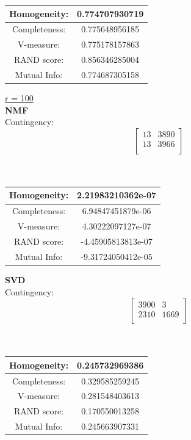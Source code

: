 \documentclass{report}
\begin{document}
\begin{center}
\begin{tabu}{| c | c |}
\hline
Homogeneity: 		& 0.774707930719  \\
\hline
Completeness: 		& 0.775648956185 \\
\hline
V-measure: 			& 0.775178157863 \\
\hline
RAND score: 		& 0.856346285004 \\
\hline
Mutual Info: 		& 0.774687305158 \\
\hline
\end{tabu}
\end{center}


\underline{ r = 100} \\
\textbf{NMF} \\
Contingency: \[
\begin{bmatrix}
13 		& 3890 \\
13 		& 3966 \\
\end{bmatrix}
\]
\\ \\

\begin{center}
\begin{tabu}{| c | c |}
\hline
Homogeneity: 		& 2.21983210362e-07 \\
\hline
Completeness: 		& 6.94847451879e-06 \\
\hline
V-measure: 			& 4.30222097127e-07 \\
\hline
RAND score: 		& -4.45905813813e-07 \\
\hline
Mutual Info: 		& -9.31724050412e-05  \\
\hline
\end{tabu}
\end{center}


\textbf{SVD} \\
Contingency: \[
\begin{bmatrix}
3900    	& 3 \\
2310	 	& 1669 \\
\end{bmatrix}
\]
\\ \\


\begin{center}
\begin{tabu}{| c | c |}
\hline
Homogeneity: 		& 0.245732969386 \\
\hline
Completeness:  		& 0.329585259245 \\
\hline
V-measure: 			& 0.281548403613 \\
\hline
RAND score: 		& 0.170550013258 \\
\hline
Mutual Info: 		& 0.245663907331 \\
\hline
\end{tabu}
\end{center}
\end{document}
